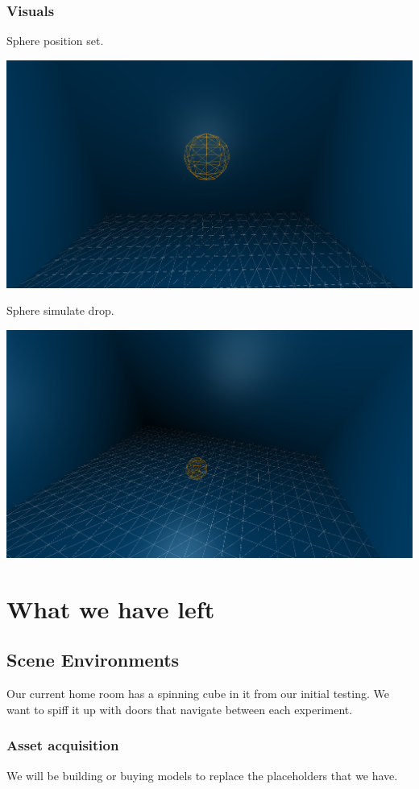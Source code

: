 \documentclass[onecolumn, draftclsnofoot,10pt, compsoc]{IEEEtran}
\begin{document}
   \subsubsection{Visuals}
   Sphere position set.
   
   \includegraphics[width=\linewidth]{images/Cannonjs.png}
   
   Sphere simulate drop.
   
   \includegraphics[width=\linewidth]{images/CannonjsDrop.png}
    


\section{What we have left}
\subsection{Scene Environments}
Our current home room has a spinning cube in it from our initial testing.  We want to spiff it up with doors that navigate between each experiment.
\subsubsection{Asset acquisition}
We will be building or buying models to replace the placeholders that we have.
\end{document}
